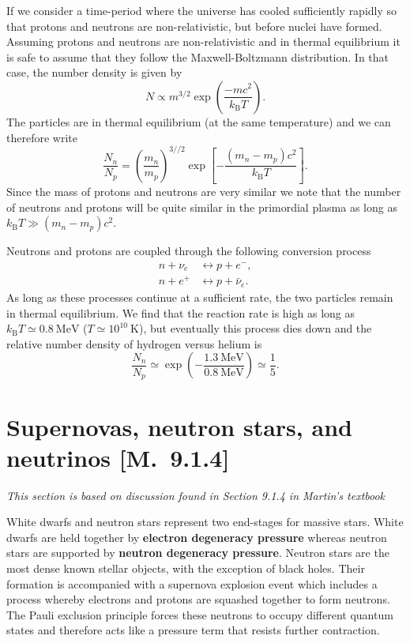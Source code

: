 \documentclass[a4paper,12pt]{article}
\theoremstyle{remark}
\newcommand{\mrm}[1]{\mathrm{#1}}
\renewcommand{\=}[1]{\stackrel{#1}{=}} %
\theoremstyle{plain}
\theoremstyle{definition}
\begin{document}
If we consider a time-period where the universe has cooled sufficiently rapidly so that protons and neutrons are non-relativistic, but before nuclei have formed. Assuming protons and neutrons are non-relativistic and in thermal equilibrium it is safe to assume that they follow the Maxwell-Boltzmann distribution. In that case, the number density is given by
\begin{equation}
N \propto m^{3/2} \exp \left( \frac{-mc^2}{k_\mrm{B} T} \right).
\end{equation}
The particles are in thermal equilibrium (at the same temperature) and we can therefore write
\begin{equation}
\frac{N_n}{N_p} = \left( \frac{m_n}{m_p} \right) ^{3//2} \exp \left[ -\frac{(m_n - m_p)c^2}{k_\mrm{B} T} \right].
\end{equation}
Since the mass of protons and neutrons are very similar we note that the number of neutrons and protons will be quite similar in the primordial plasma as long as $k_\mrm{B} T \gg (m_n - m_p)c^2$.

Neutrons and protons are coupled through the following conversion process
\begin{align}
n + \nu _e &\longleftrightarrow  p + e^-, \\
n + e^+ &\longleftrightarrow p + \bar{\nu}_e.
\end{align}
As long as these processes continue at a sufficient rate, the two particles remain in thermal equilibrium. We find that the reaction rate is high as long as $k_\mrm{B}T \simeq 0.8 \:\mrm{MeV}$ ($T\simeq10^{10}\:\mrm{K}$), but eventually this process dies down and the relative number density of hydrogen versus helium is
\begin{equation}
\frac{N_n}{N_p} \simeq \exp \left( - \frac{1.3 \:\mrm{MeV}}{0.8 \:\mrm{MeV}} \right) \simeq \frac{1}{5}. 
\end{equation}

\section{Supernovas, neutron stars, and neutrinos [M.\ 9.1.4]}
\textit{This section is based on discussion found in Section 9.1.4 in Martin's textbook}

White dwarfs and neutron stars represent two end-stages for massive stars. White dwarfs are held together by \textbf{electron degeneracy pressure} whereas neutron stars are supported by \textbf{neutron degeneracy pressure}. Neutron stars are the most dense known stellar objects, with the exception of black holes. Their formation is accompanied with a supernova explosion event which includes a process whereby electrons and protons are squashed together to form neutrons. The Pauli exclusion principle forces these neutrons to occupy different quantum states and therefore acts like a pressure term that resists further contraction.
\end{document}

